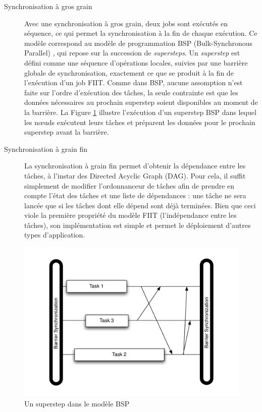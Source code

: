 \begin{description}
\item [Synchronisation à gros grain] Avec une synchronisation à gros grain, deux jobs sont exécutés en séquence, ce qui permet la synchronisation à la fin de chaque exécution. Ce modèle correspond au modèle de programmation BSP (Bulk-Synchronous Parallel) \cite{Valiant90}, qui repose sur la succession de \textit{supersteps}. Un \textit{superstep} est défini comme une séquence d'opérations locales, suivies par une barrière globale de synchronisation, exactement ce que se produit à la fin de l'exécution d'un job FIIT. Comme dans BSP, aucune assomption n'est faite sur l'ordre d'exécution des tâches, la seule contrainte est que les données nécessaires au prochain superstep soient disponibles au moment de la barrière. La Figure \ref{fig:Superstep}  illustre l'exécution d'un superstep BSP dans lequel les n{\oe}uds exécutent leurs tâches et préparent les données pour le prochain superstep avant la barrière.

\item [Synchronisation à grain fin] La synchronisation à grain fin permet d'obtenir la dépendance entre les tâches, à l'instar des Directed Acyclic Graph (DAG). Pour cela, il suffit simplement de modifier l'ordonnanceur de tâches afin de prendre en compte l'état des tâches et une liste de dépendances : une tâche ne sera lancée que si les tâches dont elle dépend sont déjà terminées. Bien que ceci viole la première propriété du modèle FIIT (l'indépendance entre les tâches), son implémentation est simple et permet le déploiement d'autres types d'application.
\end{description}


\begin{figure}
	\begin{center}
		\includegraphics[width=0.5\linewidth]{img/BSP}
		\caption{Un superstep dans le modèle BSP}\label{fig:Superstep}
	\end{center}
\end{figure}

